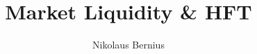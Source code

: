 

\newcommand{\faculty}{Faculty of Economics}
\newcommand{\university}{Barcelona School of Economics}
\newcommand{\studycourse}{Essay 1/4}

\author{Nikolaus Bernius}
\newcommand{\matrikelnummer}{200739}
\newcommand{\city}{Barcelona}
\newcommand{\email}{nikolaus.bernius@bse.eu}
\newcommand{\semester}{Term 2 2021/2022}


\newcommand{\worktype}{\studycourse}
\title{Market Liquidity \& HFT}

\newcommand{\referent}{Prof. Benito Arruñada}

\newcommand{\submissionDate}{17 February 2022}

 







\tableofcontents{}
\clearpage
{}
\frenchspacing


\newpage


\newpage


\newpage


\newpage


%

\newpage
\printbibliography

%


